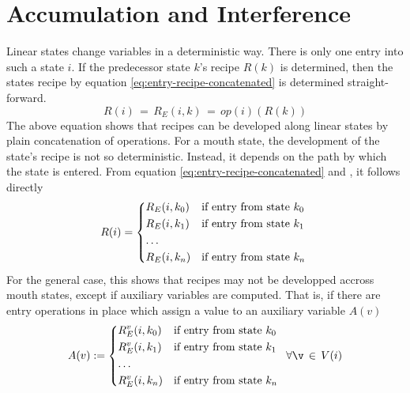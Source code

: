 \documentclass[12pt,a4paper]{scrartcl}
\begin{document}
%
\section{Accumulation and Interference}

Linear states change variables in a deterministic way. There is only one entry
into such a state $i$. If the predecessor state $k$'s recipe $R(k)$ is
determined, then the states recipe by equation \eqref{eq:entry-recipe-concatenated} 
is determined straight-forward.
\begin{equation} \label{eq:linear-state-recipe}
    R(i) \,=\,R_E(i,k) \,=\, op(i)(R(k))
\end{equation}
The above equation shows that recipes can be developed along linear states by
plain concatenation of operations.  For a mouth state, the development of the
state's recipe is not so deterministic.  Instead, it depends on the path by
which the state is entered.  From equation \eqref{eq:entry-recipe-concatenated}
and \label{eq:interference}, it follows directly
\begin{equation} \label{eq:mouth-state-recipe}
    R(i) = \begin{dcases*}
             R_E(i,k_0) & if entry from state $k_0$ \\
             R_E(i,k_1) & if entry from state $k_1$ \\
             \ldots \\
             R_E(i,k_n) & if entry from state $k_n$ \\
            \end{dcases*}
\end{equation}
For the general case, this shows that recipes may not be developped accross
mouth states, except if auxiliary variables are computed. That is, if there
are entry operations in place which assign a value to an auxiliary variable $A(v)$
\begin{equation}
    A(v) :=  \begin{dcases*}
             R^v_E(i,k_0) & if entry from state $k_0$ \\
             R^v_E(i,k_1) & if entry from state $k_1$ \\
             \ldots \\
             R^v_E(i,k_n) & if entry from state $k_n$ \\
            \end{dcases*}
            \,\forall\v\,\in\,V(i)
\end{equation}
\end{document}
